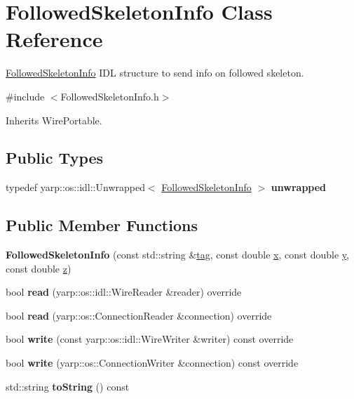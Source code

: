 \section{Followed\+Skeleton\+Info Class Reference}
\label{classFollowedSkeletonInfo}


\hyperlink{classFollowedSkeletonInfo}{Followed\+Skeleton\+Info} I\+DL structure to send info on followed skeleton.  




{\ttfamily \#include $<$Followed\+Skeleton\+Info.\+h$>$}



Inherits Wire\+Portable.

\subsection*{Public Types}
\begin{DoxyCompactItemize}
\item 
\mbox{\label{classFollowedSkeletonInfo_ab42bd5cc151abcc07852710cbb11ccb8}} 
typedef yarp\+::os\+::idl\+::\+Unwrapped$<$ \hyperlink{classFollowedSkeletonInfo}{Followed\+Skeleton\+Info} $>$ {\bfseries unwrapped}
\end{DoxyCompactItemize}
\subsection*{Public Member Functions}
\begin{DoxyCompactItemize}
\item 
\mbox{\label{classFollowedSkeletonInfo_a79eb3c479a16d42cc86911ce4bd58a0e}} 
{\bfseries Followed\+Skeleton\+Info} (const std\+::string \&\hyperlink{classFollowedSkeletonInfo_a6e749fa0208ef825c6b40ad6bbf825d4}{tag}, const double \hyperlink{classFollowedSkeletonInfo_aa73a5373607a251d22f2fdb6078ee365}{x}, const double \hyperlink{classFollowedSkeletonInfo_af988aa2cef6f97786677c2fe402def20}{y}, const double \hyperlink{classFollowedSkeletonInfo_a83222015ccfa4b8865f935d6ef777717}{z})
\item 
\mbox{\label{classFollowedSkeletonInfo_abdc9af01979e3fc0839e6f5851199688}} 
bool {\bfseries read} (yarp\+::os\+::idl\+::\+Wire\+Reader \&reader) override
\item 
\mbox{\label{classFollowedSkeletonInfo_ae2aeb71e337ee649b92ee357a892aaa6}} 
bool {\bfseries read} (yarp\+::os\+::\+Connection\+Reader \&connection) override
\item 
\mbox{\label{classFollowedSkeletonInfo_aff7da0b79de4f402d97837d7d2eea185}} 
bool {\bfseries write} (const yarp\+::os\+::idl\+::\+Wire\+Writer \&writer) const override
\item 
\mbox{\label{classFollowedSkeletonInfo_aa6ee9d16640f735a4ac69b6b530a9e95}} 
bool {\bfseries write} (yarp\+::os\+::\+Connection\+Writer \&connection) const override
\item 
\mbox{\label{classFollowedSkeletonInfo_ae3639d9c3d8254557c7dd7409f471933}} 
std\+::string {\bfseries to\+String} () const
\end{DoxyCompactItemize}
